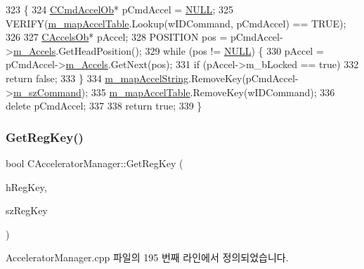 \begin{DoxyCode}
323 \{
324   \mbox{\hyperlink{class_c_cmd_accel_ob}{CCmdAccelOb}}* pCmdAccel = \mbox{\hyperlink{getopt1_8c_a070d2ce7b6bb7e5c05602aa8c308d0c4}{NULL}};
325   VERIFY(\mbox{\hyperlink{class_c_accelerator_manager_a16b8d3e9328bc0eeeb048630deff2768}{m\_mapAccelTable}}.Lookup(wIDCommand, pCmdAccel) == TRUE);
326 
327   \mbox{\hyperlink{class_c_accels_ob}{CAccelsOb}}* pAccel;
328   POSITION pos = pCmdAccel->\mbox{\hyperlink{class_c_cmd_accel_ob_a85772f1ea9204af42b8a39a0135dc0f8}{m\_Accels}}.GetHeadPosition();
329   \textcolor{keywordflow}{while} (pos != \mbox{\hyperlink{getopt1_8c_a070d2ce7b6bb7e5c05602aa8c308d0c4}{NULL}}) \{
330     pAccel = pCmdAccel->\mbox{\hyperlink{class_c_cmd_accel_ob_a85772f1ea9204af42b8a39a0135dc0f8}{m\_Accels}}.GetNext(pos);
331     \textcolor{keywordflow}{if} (pAccel->m\_bLocked == \textcolor{keyword}{true})
332       \textcolor{keywordflow}{return} \textcolor{keyword}{false};
333   \}
334   \mbox{\hyperlink{class_c_accelerator_manager_abb40dbb1a44c47ac22590e8f1243835b}{m\_mapAccelString}}.RemoveKey(pCmdAccel->\mbox{\hyperlink{class_c_cmd_accel_ob_acbd02cc68d3909b1e39b687e76f45d91}{m\_szCommand}});
335   \mbox{\hyperlink{class_c_accelerator_manager_a16b8d3e9328bc0eeeb048630deff2768}{m\_mapAccelTable}}.RemoveKey(wIDCommand);
336   \textcolor{keyword}{delete} pCmdAccel;
337 
338   \textcolor{keywordflow}{return} \textcolor{keyword}{true};
339 \}
\end{DoxyCode}
\mbox{\label{class_c_accelerator_manager_afcb43e85351bae0fb475dac40ba4cede}} 
\subsubsection{\texorpdfstring{Get\+Reg\+Key()}{GetRegKey()}}
{\footnotesize\ttfamily bool C\+Accelerator\+Manager\+::\+Get\+Reg\+Key (\begin{DoxyParamCaption}\item[{H\+K\+EY \&}]{h\+Reg\+Key,  }\item[{C\+String \&}]{sz\+Reg\+Key }\end{DoxyParamCaption})}



Accelerator\+Manager.\+cpp 파일의 195 번째 라인에서 정의되었습니다.


